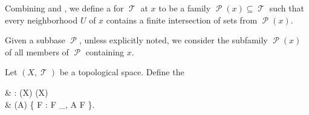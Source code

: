 \begin{definition}\label{def:topological_local_subbase}
  Combining  and , we define a  for \( \mscrT \) at \( x \) to be a family \( \mscrP(x) \subseteq \mscrT \) such that every neighborhood \( U \) of \( x \) contains a finite intersection of sets from \( \mscrP(x) \).

  Given a subbase \( \mscrP \), unless explicitly noted, we consider the subfamily \( \mscrP(x) \) of all members of \( \mscrP \) containing \( x \).
\end{definition}

\begin{definition}\label{def:closure_operator}\mcite\cite[33]{Engelking1989}
  Let \( (X, \mscrT) \) be a topological space. Define the 
  \begin{balign*}
     & \cl: \pow(X) \to \pow(X)                                           \\
     & \cl(A) \coloneqq \bigcap \{ F : F \in \mscrF_\mscrT, A \subseteq F \}.
  \end{balign*}
\end{definition}

